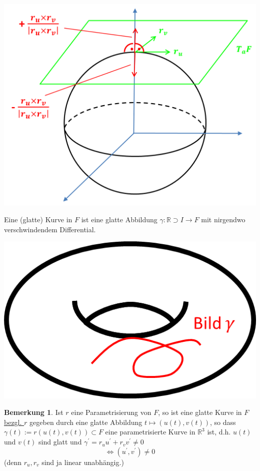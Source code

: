\documentclass[a4paper,11pt,notitlepage]{report}
\theoremstyle{definition}
\newtheorem{remark}{Bemerkung}[chapter]
\newcommand{\R}{{\ensuremath{\mathbb{R}}}}
\newenvironment{definition}[1]{
	\begin{definitions}
	\marginnote{\emph{#1}}
}{\end{definitions}}
\begin{document}
\begin{center}
	\includegraphics[scale=0.5]{images/2012_01_19_Bild5.png}
\end{center}

\begin{definition}{Kurve}
	Eine (glatte) Kurve in $F$ ist eine glatte Abbildung $\gamma \colon \R \supset I \rightarrow F$ mit nirgendwo verschwindendem Differential.
\begin{center}
	\includegraphics[scale=0.5]{images/2012_01_19_Bild6.png}
\end{center}

\end{definition}

\begin{remark}
	Ist $r$ eine Parametrisierung von $F$, so ist eine glatte Kurve in $F$ \underline{bezgl. $r$} gegeben durch eine glatte Abbildung $t \mapsto (u(t),v(t))$, so dass $\gamma(t):= r (u(t),v(t)) \subset F$ eine parametrisierte Kurve in $\R^3$ ist, d.h. $u(t)$ und $v(t)$ sind glatt und $\gamma^\prime = r_u u^\prime + r_v v^\prime \neq 0$
	$$\Leftrightarrow (u^\prime, v^\prime) \neq 0$$ (denn $r_u, r_v$ sind ja linear unabhängig.)
\end{remark}
\end{document}
